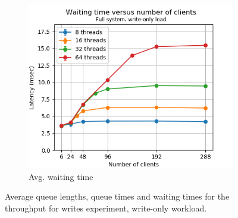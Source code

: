 \documentclass[11pt,a4paper]{article}
\begin{document}
\begin{figure}[h]
\begin{subfigure}{.33\textwidth}
  \centering
  \includegraphics[width=1.0\linewidth,trim={0px 0px 0px 0px},clip]{img/plot/tpfw-wtime_mw.png}
  \caption{Avg. waiting time}
  \label{fig:tpfw-wtime_mw}
\end{subfigure}
\caption{Average queue lengths, queue times and waiting times for the throughput for writes experiment, write-only workload.}
\label{fig:tpfw_stats_mw}
\end{figure}
\end{document}
